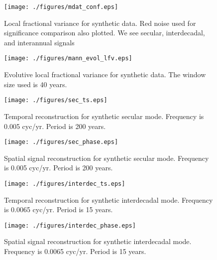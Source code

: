 \documentclass[phd,tocprelim]{cornell}
\begin{document}

\begin{figure}[!tbp]
\centering
\texttt{[image: ./figures/mdat\_conf.eps]}
\caption{Local fractional variance for synthetic data. Red noise used for significance comparison also plotted. We see secular, interdecadal, and interannual signals}
\label{mann:conf}
\end{figure}

\begin{figure}[!tbp]
\centering
\texttt{[image: ./figures/mann\_evol\_lfv.eps]}
\caption{Evolutive local fractional variance for synthetic data. The window size used is 40 years.}
\label{mann:conf:evol}
\end{figure}

\begin{figure}[!tbp]
\centering
\begin{minipage}[b]{0.45\textwidth}
\texttt{[image: ./figures/sec\_ts.eps]}
\caption{Temporal reconstruction for synthetic secular mode. Frequency is 0.005 cyc/yr. Period is 200 years.}
\label{sec:ts}
\end{minipage}
\hfill
\begin{minipage}[b]{0.45\textwidth}
\texttt{[image: ./figures/sec\_phase.eps]}
\caption{Spatial signal reconstruction for synthetic secular mode. Frequency is 0.005 cyc/yr. Period is 200 years.}
\label{sec:phase}
\end{minipage}
\end{figure}

\begin{figure}[!tbp]
\centering
\begin{minipage}[b]{0.45\textwidth}
\texttt{[image: ./figures/interdec\_ts.eps]}
\caption{Temporal reconstruction for synthetic interdecadal mode. Frequency is 0.0065 cyc/yr. Period is 15 years.}
\label{interdec:ts}
\end{minipage}
\hfill
\begin{minipage}[b]{0.45\textwidth}
\texttt{[image: ./figures/interdec\_phase.eps]}
\caption{Spatial signal reconstruction for synthetic interdecadal mode. Frequency is 0.0065 cyc/yr. Period is 15 years.}
\label{interdec:phase}
\end{minipage}
\end{figure}
\end{document}
